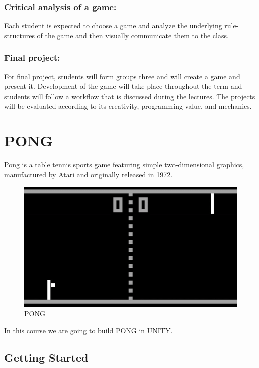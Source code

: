 \documentclass[
]{book}
\begin{document}
\hypertarget{critical-analysis-of-a-game}{%
\subsection{Critical analysis of a game:}\label{critical-analysis-of-a-game}}

Each student is expected to choose a game and analyze the underlying rule-structures of the game and then visually communicate them to the class.

\hypertarget{final-project}{%
\subsection{Final project:}\label{final-project}}

For final project, students will form groups three and will create a game and present it. Development of the game will take place throughout the term and students will follow a workflow that is discussed during the lectures. The projects will be evaluated according to its creativity, programming value, and mechanics.

\hypertarget{pong}{%
\chapter{PONG}\label{pong}}

Pong is a table tennis sports game featuring simple two-dimensional graphics, manufactured by Atari
and originally released in 1972.

\begin{figure}
\centering
\includegraphics{Images/pong.gif}
\caption{PONG}
\end{figure}

In this course we are going to build PONG in UNITY.

\hypertarget{getting-started}{%
\section{Getting Started}\label{getting-started}}
\end{document}
